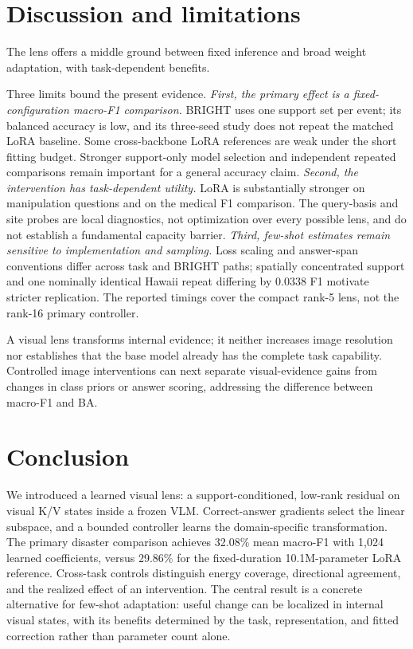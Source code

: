 \documentclass{article}
\begin{document}
\section{Discussion and limitations}
\label{sec:limitations}
The lens offers a middle ground between fixed inference and broad weight adaptation, with task-dependent benefits.

Three limits bound the present evidence. \emph{First, the primary effect is a fixed-configuration macro-F1 comparison.} BRIGHT uses one support set per event; its balanced accuracy is low, and its three-seed study does not repeat the matched LoRA baseline. Some cross-backbone LoRA references are weak under the short fitting budget. Stronger support-only model selection and independent repeated comparisons remain important for a general accuracy claim. \emph{Second, the intervention has task-dependent utility.} LoRA is substantially stronger on manipulation questions and on the medical F1 comparison. The query-basis and site probes are local diagnostics, not optimization over every possible lens, and do not establish a fundamental capacity barrier. \emph{Third, few-shot estimates remain sensitive to implementation and sampling.} Loss scaling and answer-span conventions differ across task and BRIGHT paths; spatially concentrated support and one nominally identical Hawaii repeat differing by 0.0338 F1 motivate stricter replication. The reported timings cover the compact rank-5 lens, not the rank-16 primary controller.

A visual lens transforms internal evidence; it neither increases image resolution nor establishes that the base model already has the complete task capability. Controlled image interventions can next separate visual-evidence gains from changes in class priors or answer scoring, addressing the difference between macro-F1 and BA.

\section{Conclusion}
\label{sec:conclusion}
We introduced a learned visual lens: a support-conditioned, low-rank residual on visual K/V states inside a frozen VLM. Correct-answer gradients select the linear subspace, and a bounded controller learns the domain-specific transformation. The primary disaster comparison achieves 32.08\% mean macro-F1 with 1,024 learned coefficients, versus 29.86\% for the fixed-duration 10.1M-parameter LoRA reference. Cross-task controls distinguish energy coverage, directional agreement, and the realized effect of an intervention. The central result is a concrete alternative for few-shot adaptation: useful change can be localized in internal visual states, with its benefits determined by the task, representation, and fitted correction rather than parameter count alone.
\label{maintextend}
\end{document}
